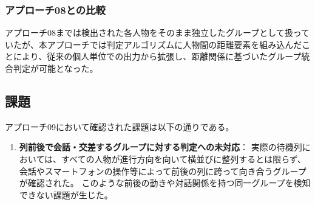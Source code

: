 \subsubsection{アプローチ08との比較}
アプローチ08までは検出された各人物をそのまま独立したグループとして扱っていたが、本アプローチでは判定アルゴリズムに人物間の距離要素を組み込んだことにより、従来の個人単位での出力から拡張し、距離関係に基づいたグループ統合判定が可能となった。

\subsection{課題}
アプローチ09において確認された課題は以下の通りである。

\begin{enumerate}
    \item \textbf{列前後で会話・交差するグループに対する判定への未対応}：
    実際の待機列においては、すべての人物が進行方向を向いて横並びに整列するとは限らず、会話やスマートフォンの操作等によって前後の列に跨って向き合うグループが確認された。
    このような前後の動きや対話関係を持つ同一グループを検知できない課題が生じた。
\end{enumerate}

\clearpage
